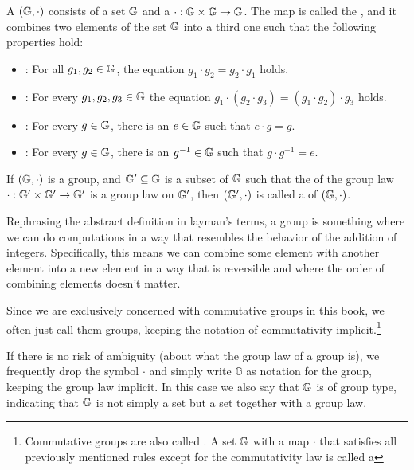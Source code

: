 
\begin{definition}
\label{def:commutative_group}
A  $(\mathbb{G},\cdot) $ consists of a set $\mathbb{G}$ and a  $\cdot:\mathbb{G} \times \mathbb{G} \to \mathbb{G} $. The map is called the , and it combines two elements of the set $ \mathbb{G}$ into a third one such that the following properties hold:
\begin{itemize}
\item {}: For all $g_1,g_2\in\mathbb{G}$, the equation $g_1\cdot g_2=g_2\cdot g_1$ holds.
\item {}: For every $g_1,g_2,g_3\in\mathbb{G}$ the equation
$g_1\cdot(g_2\cdot g_3) = (g_1\cdot g_2)\cdot g_3$ holds.
\item {}: For every $g\in\mathbb{G}$, there is an $e\in\mathbb{G}$ such that $e\cdot g=g$.
\item {}: For every $g\in\mathbb{G}$, there is an $g^{-1}\in\mathbb{G}$ such that $g\cdot g^{-1}=e$.
\end{itemize}
If $(\mathbb{G},\cdot)$ is a group, and $\mathbb{G}'\subseteq\mathbb{G}$ is a subset of $\mathbb{G}$ such that the  of the group law $\cdot: \mathbb{G}'\times \mathbb{G}' \to \mathbb{G}'$ is a group law on $\mathbb{G}'$, then $(\mathbb{G}',\cdot)$ is called a  of $(\mathbb{G},\cdot)$.
\end{definition}

Rephrasing the abstract definition in layman's terms, a group is something where we can do computations in a way that resembles the behavior of the addition of integers. Specifically, this means we can combine some element with another element into a new element in a way that is reversible and where the order of combining elements doesn't matter.

\begin{notation}Since we are exclusively concerned with commutative groups in this book, we often just call them groups, keeping the notation of commutativity implicit.\footnote{Commutative groups are also called . A set $\mathbb{G}$ with a map $\cdot$ that satisfies all previously mentioned rules except for the commutativity law is called a } 

If there is no risk of ambiguity (about what the group law of a group is), we frequently drop the symbol $\cdot$ and simply write $\mathbb{G}$ as notation for the group, keeping the group law implicit. In this case we also say that $\mathbb{G}$ is of group type, indicating that $\mathbb{G}$ is not simply a set but a set together with a group law.
\end{notation}

